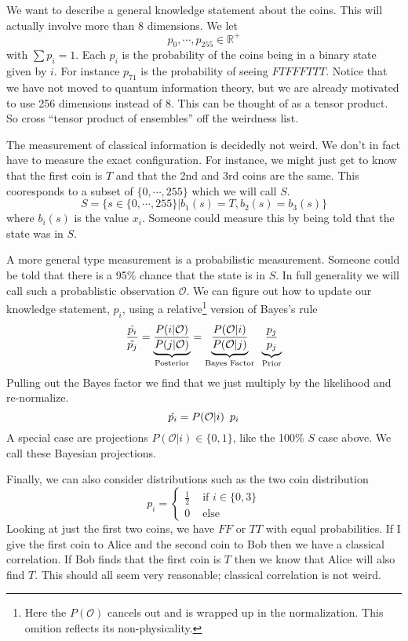 \documentclass[12pt,a4paper]{article}
\begin{document}
We want to describe a general knowledge statement about the coins.  This will actually involve more than 8 dimensions.  We let
\[
   p_0,\cdots,p_{255} \in \mathbb{R}^+
\]
with $\sum p_i = 1$.  Each $p_i$ is the probability of the coins being in a binary state given by $i$.  For instance $p_{71}$ is the probability of seeing $FTFFFTTT$. Notice that we have not moved to quantum information theory, but we are already motivated to use 256 dimensions instead of 8.  This can be thought of as a tensor product.  So cross ``tensor product of ensembles'' off the weirdness list.

The measurement of classical information is decidedly not weird.  We don't in fact have to measure the exact configuration.  For instance, we might just get to know that the first coin is $T$ and that the 2nd and 3rd coins are the same.  This cooresponds to a subset of $\{0,\cdots,255\}$ which we will call $S$.
\[
   S = \{s \in \{0,\cdots,255\} | b_1(s) = T, b_2(s) = b_3(s) \}
\]
where $b_i(s)$ is the value $x_i$.  Someone could measure this by being told that the state was in $S$.

A more general type measurement is a probabilistic measurement.  Someone could be told that there is a 95\% chance that the state is in $S$.  In full generality we will call such a probablistic observation $\mathcal{O}$.  We can figure out how to update our knowledge statement, $p_i$, using a relative\footnote{Here the $P(\mathcal{O})$ cancels out and is wrapped up in the normalization. This omition reflects its non-physicality.} version of Bayes's rule
\[
  \frac{\hat{p_i}}{\hat{p_j}} = \underbrace{\frac{P(i | \mathcal{O})}{P(j | \mathcal{O})}}_\text{Posterior}
                              = \underbrace{\frac{P(\mathcal{O} | i)}{P(\mathcal{O}|j)}}_\text{Bayes Factor}  \hspace{0.07 in}  \underbrace{\frac{p_j}{p_j}}_\text{Prior}
\]
Pulling out the Bayes factor we find that we just multiply by the likelihood and re-normalize.
\[
  \hat{p_i} =  P(\mathcal{O} | i) \hspace{0.07 in} p_i
\]
A special case are projections $P(\mathcal{O} | i) \in \{0,1\}$, like the 100\% $S$ case above.  We call these Bayesian projections.

Finally, we can also consider distributions such as the two coin distribution
\[
p_i = 
\left\{
\begin{split}
\frac{1}{2} & \mbox{ if } i \in \{0,3\}\\
0 &\mbox{ else }
\end{split}
\right.
\]
Looking at just the first two coins, we have $FF$ or $TT$ with equal probabilities.  If I give the first coin to Alice and the second coin to Bob then we have a classical correlation.  If Bob finds that the first coin is $T$ then we know that Alice will also find $T$.  This should all seem very reasonable; classical correlation is not weird.
\end{document}

